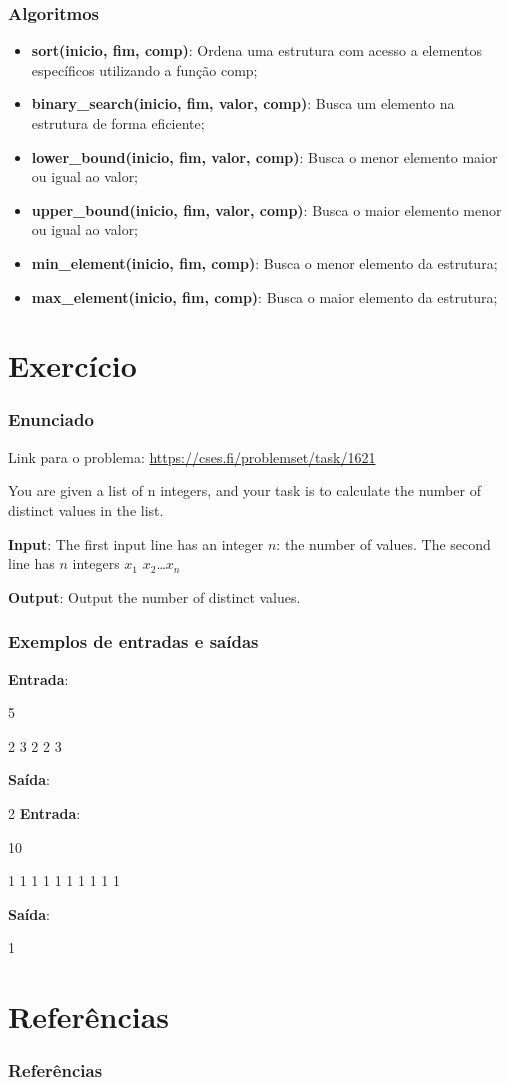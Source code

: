 \documentclass[12pt]{beamer}
\begin{document}
\begin{frame}
    \frametitle{Algoritmos}

    \begin{itemize}
        \item\textbf{sort(inicio, fim, comp)}: Ordena uma estrutura com acesso a elementos específicos utilizando a função comp;
        \item\textbf{binary\_search(inicio, fim, valor, comp)}: Busca um elemento na estrutura de forma eficiente;
        \item\textbf{lower\_bound(inicio, fim, valor, comp)}: Busca o menor elemento maior ou igual ao valor;
        \item\textbf{upper\_bound(inicio, fim, valor, comp)}: Busca o maior elemento menor ou igual ao valor;
        \item\textbf{min\_element(inicio, fim, comp)}: Busca o menor elemento da estrutura;
        \item\textbf{max\_element(inicio, fim, comp)}: Busca o maior elemento da estrutura;
    \end{itemize}

\end{frame}

\section{Exercício}\label{Exercício}
\begin{frame}
    \frametitle{Enunciado}

    Link para o problema: \url{https://cses.fi/problemset/task/1621}

    \vspace{0.5cm}

    You are given a list of n integers,
    and your task is to calculate the number
    of distinct values in the list.

    \vspace{0.5cm}

    \textbf{Input}: The first input line has an integer $n$: the number of values.
    The second line has $n$ integers $x_1$ $x_2 $\ldots $x_n$

    \textbf{Output}: Output the number of distinct values.
\end{frame}

\begin{frame}
    \frametitle{Exemplos de entradas e saídas}

    \textbf{Entrada}:

    5

    2 3 2 2 3

    \textbf{Saída}:

    2
    \vfill
    \textbf{Entrada}:

    10

    1 1 1 1 1 1 1 1 1 1

    \textbf{Saída}:

    1


\end{frame}

\section{Referências}\label{Referências}
\begin{frame}[allowframebreaks]
    \frametitle{Referências}
    
\end{frame}
\end{document}
